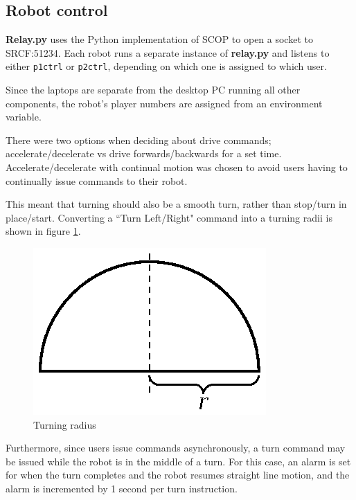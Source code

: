 \documentclass[12pt,a4,notitlepage]{report}
\renewcommand{\_}{\texttt{\symbol{95}}}
\newcommand{\<}{\texttt{\symbol{60}}}
\renewcommand{\>}{\texttt{\symbol{62}}}
\newcommand{\class}[1]{\textbf{#1}}
\newcommand{\scopendpoint}[1]{\texttt{#1}}
\begin{document}
\subsection{Robot control}

\class{Relay.py} uses the Python implementation of SCOP to open a socket to SRCF:51234. Each robot runs a separate instance of \class{relay.py} and listens to either \scopendpoint{p1ctrl} or \scopendpoint{p2ctrl}, depending on which one is assigned to which user. 

Since the laptops are separate from the desktop PC running all other components, the robot's player numbers are assigned from an environment variable.

There were two options when deciding about drive commands; accelerate/decelerate vs drive forwards/backwards for a set time. Accelerate/decelerate with continual motion was chosen to avoid users having to continually issue commands to their robot.

This meant that turning should also be a smooth turn, rather than stop/turn in place/start. Converting a ``Turn Left/Right" command into a turning radii is shown in figure \ref{tradius}.

\begin{figure}
\centering
\includegraphics[scale=1.0,angle=0]{diagrams/turningradius.ps}
\caption{Turning radius}
\label{tradius}
\end{figure}

Furthermore, since users issue commands asynchronously, a turn command may be issued while the robot is in the middle of a turn. For this case, an alarm is set for when the turn completes and the robot resumes straight line motion, and the alarm is incremented by 1 second per turn instruction. 
\end{document}
